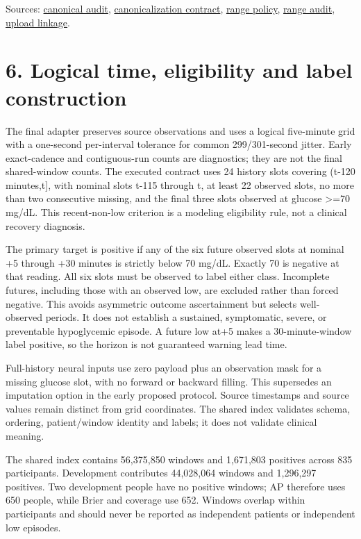 \documentclass[11pt,a4paper]{article}
\begin{document}
Sources: \href{loop_cgm_canonical_audit.md}{canonical audit}, \href{loop_canonicalization_spec.md}{canonicalization contract}, \href{loop_cgm_range_policy.md}{range policy}, \href{../audit/loop_cgm_range_sensitivity.json}{range audit}, \href{loop_upload_linkage_audit.md}{upload linkage}.

\section*{6. Logical time, eligibility and label construction}
The final adapter preserves source observations and uses a logical five-minute grid with a one-second per-interval tolerance for common 299/301-second jitter. Early exact-cadence and contiguous-run counts are diagnostics; they are not the final shared-window counts. The executed contract uses 24 history slots covering (t-120 minutes,t], with nominal slots t-115 through t, at least 22 observed slots, no more than two consecutive missing, and the final three slots observed at glucose >=70 mg/dL. This recent-non-low criterion is a modeling eligibility rule, not a clinical recovery diagnosis.

The primary target is positive if any of the six future observed slots at nominal +5 through +30 minutes is strictly below 70 mg/dL. Exactly 70 is negative at that reading. All six slots must be observed to label either class. Incomplete futures, including those with an observed low, are excluded rather than forced negative. This avoids asymmetric outcome ascertainment but selects well-observed periods. It does not establish a sustained, symptomatic, severe, or preventable hypoglycemic episode. A future low at+5 makes a 30-minute-window label positive, so the horizon is not guaranteed warning lead time.

Full-history neural inputs use zero payload plus an observation mask for a missing glucose slot, with no forward or backward filling. This supersedes an imputation option in the early proposed protocol. Source timestamps and source values remain distinct from grid coordinates. The shared index validates schema, ordering, patient/window identity and labels; it does not validate clinical meaning.

The shared index contains 56,375,850 windows and 1,671,803 positives across 835 participants. Development contributes 44,028,064 windows and 1,296,297 positives. Two development people have no positive windows; AP therefore uses 650 people, while Brier and coverage use 652. Windows overlap within participants and should never be reported as independent patients or independent low episodes.
\end{document}
